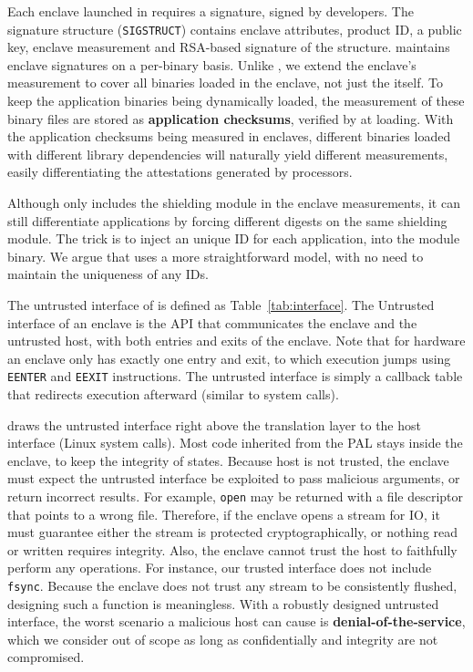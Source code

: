 Each enclave launched in \sgx{} requires a signature, signed by developers.
The signature structure ({\tt SIGSTRUCT}) contains
enclave attributes, product ID, a public key, enclave measurement
and RSA-based signature of the structure.
\sysname{} maintains enclave signatures on a per-binary basis.
Unlike \haven{}, we extend the enclave's measurement to
cover all binaries loaded in the enclave, not just the \libos{} itself.
To keep the application binaries being dynamically loaded,
the measurement of these binary files are stored as
{\bf application checksums}, verified by \sysname{} at loading.
With the application checksums being measured in enclaves,
different binaries loaded with different library dependencies
will naturally yield different measurements,
easily differentiating the attestations generated by processors.

Although \haven{} only includes the shielding module
in the enclave measurements,
it can still differentiate applications by forcing different digests
on the same shielding module.
The trick is to inject an unique ID for each application,
into the module binary.
We argue that \sysname{} uses a more straightforward model, with no need to
maintain the uniqueness of any IDs.

The untrusted interface of \sysname{} is defined as Table~\ref{tab:interface}.
The Untrusted interface of an enclave is the API that communicates the enclave
and the untrusted host, with both entries and exits of the enclave.
Note that for hardware an enclave only has exactly one entry and exit,
to which execution jumps
using {\tt EENTER} and {\tt EEXIT} instructions.
The untrusted interface is simply a callback table that redirects execution
afterward (similar to system calls).

\sysname{} draws the untrusted interface right above the translation layer
to the host interface (Linux system calls).
Most code inherited from the \graphene{} PAL stays inside
the enclave, to keep the integrity of states.
Because host is not trusted,
the enclave must expect the untrusted interface be exploited to
pass malicious arguments, or return incorrect results.
For example, {\tt open} may be returned with a file descriptor that points
to a wrong file. Therefore, if the enclave opens a stream for IO,
it must guarantee either the stream is protected cryptographically,
or nothing read or written requires integrity.
Also, the enclave cannot trust the host to faithfully perform any operations.
For instance, our trusted interface does not include {\tt fsync}.
Because the enclave does not trust any stream to be consistently flushed,
designing such a function is meaningless.
With a robustly designed untrusted interface,
the worst scenario a malicious host can cause is {\bf denial-of-the-service},
which we consider out of scope
as long as confidentially and integrity are not compromised.

